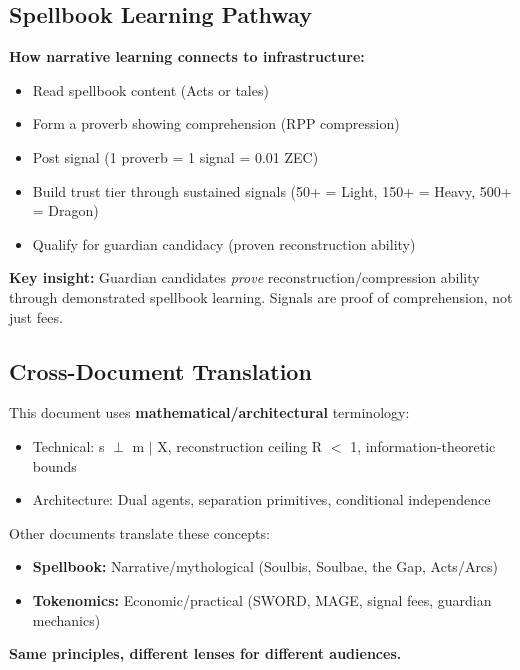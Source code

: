 \documentclass[11pt,a4paper]{article}
\theoremstyle{definition}
\begin{document}
\subsection*{Spellbook Learning Pathway}

\textbf{How narrative learning connects to infrastructure:}

\begin{itemize}
    \item Read spellbook content (Acts or tales)
    \item Form a proverb showing comprehension (RPP compression)
    \item Post signal (1 proverb = 1 signal = 0.01 ZEC)
    \item Build trust tier through sustained signals (50+ = Light, 150+ = Heavy, 500+ = Dragon)
    \item Qualify for guardian candidacy (proven reconstruction ability)
\end{itemize}

\textbf{Key insight:} Guardian candidates \textit{prove} reconstruction/compression ability through demonstrated spellbook learning. Signals are proof of comprehension, not just fees.

\subsection*{Cross-Document Translation}

This document uses \textbf{mathematical/architectural} terminology:

\begin{itemize}
    \item Technical: s $\perp$ m $|$ X, reconstruction ceiling R $<$ 1, information-theoretic bounds
    \item Architecture: Dual agents, separation primitives, conditional independence
\end{itemize}

Other documents translate these concepts:

\begin{itemize}
    \item \textbf{Spellbook:} Narrative/mythological (Soulbis, Soulbae, the Gap, Acts/Arcs)
    \item \textbf{Tokenomics:} Economic/practical (SWORD, MAGE, signal fees, guardian mechanics)
\end{itemize}

\textbf{Same principles, different lenses for different audiences.}
\end{document}
